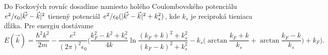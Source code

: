 \documentclass[
	11pt, %
]{beamer}
\begin{document}
\begin{frame}
Do Fockových rovníc dosadíme namiesto holého Coulombovského potenciálu  $e^2/\epsilon_0|\vec{k'}-\vec{k}|^2$ tienený potenciál  $e^2/\epsilon_0(|\vec{k'}-\vec{k}|^2+k_s^2)$, kde $k_s$ je reciproká tieniaca dĺžka.
Pre energiu dostávame
 \tiny
 \begin{equation}
  \label{eq:fock_screen_final}
  E(\vec{k})=\frac{\hbar^2 k^2} {2m} - \frac{e^2}{(2\pi)^2\epsilon_0} \biggl(
    \frac{k_F^2-k^2+k_s^2}{4k} \ln{\frac{(k_F+k)^2+k_s^2}{(k_F-k)^2+k_s^2}}-k_s\bigl(\arctan{\frac{k_F+k}{k_s}}+\arctan{\frac{k_F-k}{k_s}}\bigr)+k_F\biggr) \text{.}
 \end{equation}
  \normalsize

\vspace{-10mm}
\begin{figure}%
    \centering

\end{figure}
\end{frame}
\end{document}
